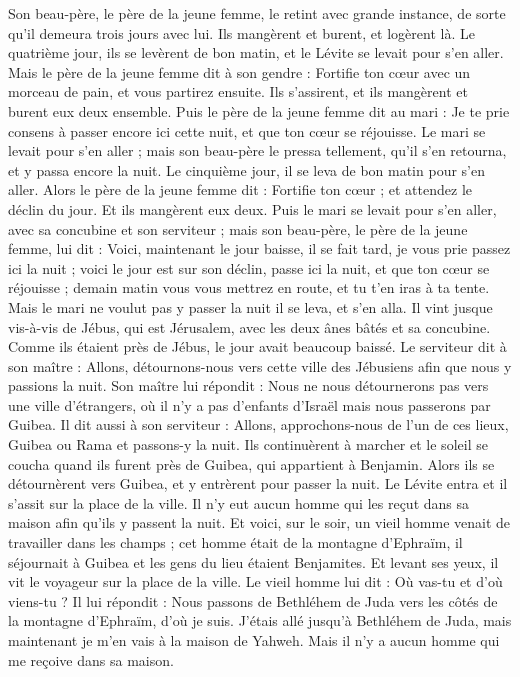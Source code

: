 \begin{multicols}{2}
Son beau-père, le père de la jeune femme, le retint avec grande instance, de sorte qu'il demeura trois jours avec lui. Ils mangèrent et burent, et logèrent là.
Le quatrième jour, ils se levèrent de bon matin, et le Lévite se levait pour s'en aller. Mais le père de la jeune femme dit à son gendre : Fortifie ton cœur avec un morceau de pain, et vous partirez ensuite.
Ils s'assirent, et ils mangèrent et burent eux deux ensemble. Puis le père de la jeune femme dit au mari : Je te prie consens à passer encore ici cette nuit, et que ton cœur se réjouisse.
Le mari se levait pour s'en aller ; mais son beau-père le pressa tellement, qu'il s'en retourna, et y passa encore la nuit.
Le cinquième jour, il se leva de bon matin pour s'en aller. Alors le père de la jeune femme dit : Fortifie ton cœur ; et attendez le déclin du jour. Et ils mangèrent eux deux.
Puis le mari se levait pour s'en aller, avec sa concubine et son serviteur ; mais son beau-père, le père de la jeune femme, lui dit : Voici, maintenant le jour baisse, il se fait tard, je vous prie passez ici la nuit ; voici le jour est sur son déclin, passe ici la nuit, et que ton cœur se réjouisse ; demain matin vous vous mettrez en route, et tu t'en iras à ta tente.
Mais le mari ne voulut pas y passer la nuit il se leva, et s'en alla. Il vint jusque vis-à-vis de Jébus, qui est Jérusalem, avec les deux ânes bâtés et sa concubine.
Comme ils étaient près de Jébus, le jour avait beaucoup baissé. Le serviteur dit à son maître : Allons, détournons-nous vers cette ville des Jébusiens afin que nous y passions la nuit.
Son maître lui répondit : Nous ne nous détournerons pas vers une ville d'étrangers, où il n'y a pas d'enfants d'Israël mais nous passerons par Guibea.
Il dit aussi à son serviteur : Allons, approchons-nous de l'un de ces lieux, Guibea ou Rama et passons-y la nuit.
Ils continuèrent à marcher et le soleil se coucha quand ils furent près de Guibea, qui appartient à Benjamin.
Alors ils se détournèrent vers Guibea, et y entrèrent pour passer la nuit. Le Lévite entra et il s'assit sur la place de la ville. Il n'y eut aucun homme qui les reçut dans sa maison afin qu'ils y passent la nuit.
Et voici, sur le soir, un vieil homme venait de travailler dans les champs ; cet homme était de la montagne d'Ephraïm, il séjournait à Guibea et les gens du lieu étaient Benjamites.
Et levant ses yeux, il vit le voyageur sur la place de la ville. Le vieil homme lui dit : Où vas-tu et d'où viens-tu ?
Il lui répondit : Nous passons de Bethléhem de Juda vers les côtés de la montagne d'Ephraïm, d'où je suis. J'étais allé jusqu'à Bethléhem de Juda, mais maintenant je m'en vais à la maison de Yahweh. Mais il n'y a aucun homme qui me reçoive dans sa maison.

\end{multicols}
